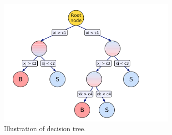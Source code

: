 
\begin{figure}
\begin{center}
\includegraphics[width=0.8\textwidth,keepaspectratio]{plots_and_figures/chapter5/decision_tree.png}
\caption{Illustration of decision tree.~\cite{tmva_manual}}
\label{fig:dec_tree}
\end{center}
\end{figure}


